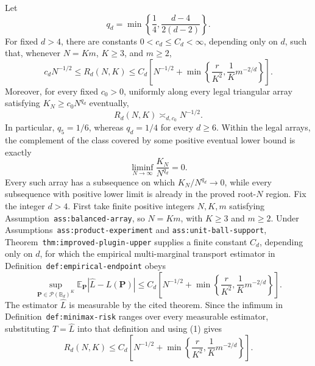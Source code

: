 Let
\[
q_d=\min\left\{\frac14,\frac{d-4}{2(d-2)}\right\}.
\]
For fixed \(d>4\), there are constants \(0<c_d\le C_d<\infty\), depending only on \(d\), such that, whenever \(N=Km\), \(K\ge3\), and \(m\ge2\),
\[
c_dN^{-1/2}\le R_d(N,K)
\le C_d\left[N^{-1/2}+\min\left\{\frac r{K^2},\frac1K m^{-2/d}\right\}\right].
\]
Moreover, for every fixed \(c_0>0\), uniformly along every legal triangular array satisfying \(K_N\ge c_0N^{q_d}\) eventually,
\[
R_d(N,K)\asymp_{d,c_0}N^{-1/2}.
\]
In particular, \(q_5=1/6\), whereas \(q_d=1/4\) for every \(d\ge6\).
Within the legal arrays, the complement of the class covered by some positive eventual lower bound is exactly
\[
\liminf_{N\to\infty}\frac{K_N}{N^{q_d}}=0.
\]
Every such array has a subsequence on which \(K_N/N^{q_d}\to0\), while every subsequence with positive lower limit is already in the proved root-\(N\) region.
Fix the integer \(d>4\).  First take finite positive integers \(N,K,m\) satisfying Assumption~\texttt{ass:balanced-array}, so \(N=Km\), with \(K\ge3\) and \(m\ge2\).  Under Assumptions~\texttt{ass:product-experiment} and \texttt{ass:unit-ball-support}, Theorem~\texttt{thm:improved-plugin-upper} supplies a finite constant \(C_d\), depending only on \(d\), for which the empirical multi-marginal transport estimator in Definition~\texttt{def:empirical-endpoint} obeys
\[
\sup_{\mathbf P\in\mathcal P(\mathbb B_d)^K}
\mathbb E_{\mathbf P}|\widehat L-L(\mathbf P)|
\le C_d\left[N^{-1/2}+
\min\left\{\frac r{K^2},\frac1K m^{-2/d}\right\}\right].
\tag{1}
\]
The estimator \(\widehat L\) is measurable by the cited theorem.  Since the infimum in Definition~\texttt{def:minimax-risk} ranges over every measurable estimator, substituting \(T=\widehat L\) into that definition and using (1) gives
\[
R_d(N,K)
\le C_d\left[N^{-1/2}+
\min\left\{\frac r{K^2},\frac1K m^{-2/d}\right\}\right].
\tag{2}
\]

